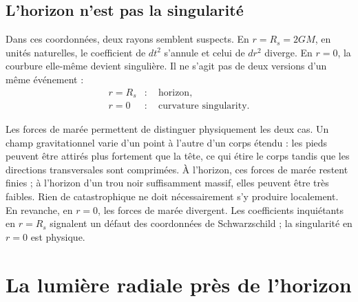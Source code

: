 
\subsection{L’horizon n’est pas la singularité}

Dans ces coordonnées, deux rayons semblent suspects. En \(r=R_s=2GM\), en unités naturelles, le coefficient de \(dt^2\) s’annule et celui de \(dr^2\) diverge. En \(r=0\), la courbure elle-même devient singulière. Il ne s’agit pas de deux versions d’un même événement :
\begin{equation}
\begin{aligned}
r=R_s &:\quad \text{horizon},\\
r=0 &:\quad \text{curvature singularity}.
\end{aligned}
\end{equation}

Les forces de marée permettent de distinguer physiquement les deux cas. Un champ gravitationnel varie d’un point à l’autre d’un corps étendu : les pieds peuvent être attirés plus fortement que la tête, ce qui étire le corps tandis que les directions transversales sont comprimées. À l’horizon, ces forces de marée restent finies ; à l’horizon d’un trou noir suffisamment massif, elles peuvent être très faibles. Rien de catastrophique ne doit nécessairement s’y produire localement. En revanche, en \(r=0\), les forces de marée divergent. Les coefficients inquiétants en \(r=R_s\) signalent un défaut des coordonnées de Schwarzschild ; la singularité en \(r=0\) est physique.


\section{La lumière radiale près de l’horizon}

